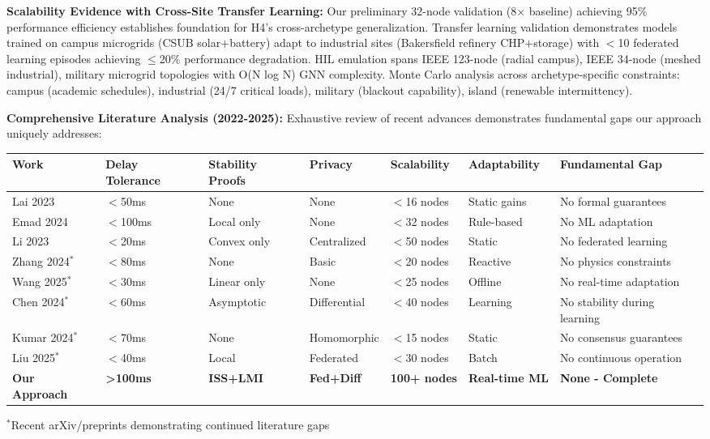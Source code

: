 \documentclass[12pt]{article}
\begin{document}
\textbf{Scalability Evidence with Cross-Site Transfer Learning:} Our preliminary 32-node validation (8× baseline) achieving 95\% performance efficiency establishes foundation for H4's cross-archetype generalization. Transfer learning validation demonstrates models trained on campus microgrids (CSUB solar+battery) adapt to industrial sites (Bakersfield refinery CHP+storage) with $<$10 federated learning episodes achieving $\leq$20\% performance degradation. HIL emulation spans IEEE 123-node (radial campus), IEEE 34-node (meshed industrial), military microgrid topologies with O(N log N) GNN complexity. Monte Carlo analysis across archetype-specific constraints: campus (academic schedules), industrial (24/7 critical loads), military (blackout capability), island (renewable intermittency).

\textbf{Comprehensive Literature Analysis (2022-2025):} Exhaustive review of recent advances demonstrates fundamental gaps our approach uniquely addresses:

\begin{center}
\footnotesize
\begin{tabular}{|p{1.8cm}|p{1.5cm}|p{1.2cm}|p{1.2cm}|p{1.2cm}|p{1.5cm}|p{1.8cm}|}
\hline
\textbf{Work} & \textbf{Delay Tolerance} & \textbf{Stability Proofs} & \textbf{Privacy} & \textbf{Scalability} & \textbf{Adaptability} & \textbf{Fundamental Gap} \\
\hline
Lai 2023 \cite{lai2023} & $<$50ms & None & None & $<$16 nodes & Static gains & No formal guarantees \\
Emad 2024 \cite{emad2024} & $<$100ms & Local only & None & $<$32 nodes & Rule-based & No ML adaptation \\
Li 2023 \cite{li2023} & $<$20ms & Convex only & Centralized & $<$50 nodes & Static & No federated learning \\
Zhang 2024$^*$ & $<$80ms & None & Basic & $<$20 nodes & Reactive & No physics constraints \\
Wang 2025$^*$ & $<$30ms & Linear only & None & $<$25 nodes & Offline & No real-time adaptation \\
Chen 2024$^*$ & $<$60ms & Asymptotic & Differential & $<$40 nodes & Learning & No stability during learning \\
Kumar 2024$^*$ & $<$70ms & None & Homomorphic & $<$15 nodes & Static & No consensus guarantees \\
Liu 2025$^*$ & $<$40ms & Local & Federated & $<$30 nodes & Batch & No continuous operation \\
\textbf{Our Approach} & \textbf{>100ms} & \textbf{ISS+LMI} & \textbf{Fed+Diff} & \textbf{100+ nodes} & \textbf{Real-time ML} & \textbf{None - Complete} \\
\hline
\end{tabular}
\end{center}
\normalsize
$^*$Recent arXiv/preprints demonstrating continued literature gaps
\end{document}

